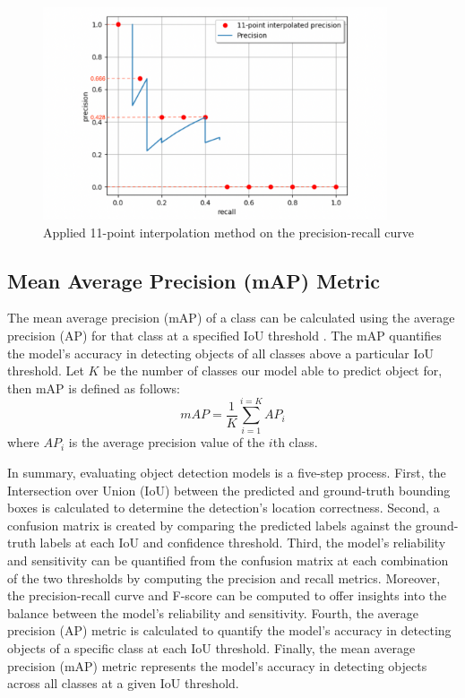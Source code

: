\begin{figure}[!ht]
    \centering
    \includegraphics[width=4in]{figures/11AP_ex.png}
    \caption{Applied 11-point interpolation method on the precision-recall curve \cite{metrics_survey_2020}}
    \label{fig:11AP_ex}
\end{figure}

\subsection{Mean Average Precision (mAP) Metric}  \label{subsec:mean_ap_metric}
The mean average precision (mAP) of a class can be calculated using the average precision (AP) for that class at a specified IoU threshold \cite{szeliski_cv_book}. The mAP quantifies the model's accuracy in detecting objects of all classes above a particular IoU threshold. Let $K$ be the number of classes our model able to predict object for, then mAP is defined as follows:
\begin{equation}
    mAP = \frac{1}{K} \sum_{i=1}^{i=K}AP_i
\end{equation}
where $AP_i$ is the average precision value of the $i$th class.

In summary, evaluating object detection models is a five-step process. First, the Intersection over Union (IoU) between the predicted and ground-truth bounding boxes is calculated to determine the detection's location correctness. Second, a confusion matrix is created by comparing the predicted labels against the ground-truth labels at each IoU and confidence threshold. Third, the model's reliability and sensitivity can be quantified from the confusion matrix at each combination of the two thresholds by computing the precision and recall metrics. Moreover, the precision-recall curve and F-score can be computed to offer insights into the balance between the model's reliability and sensitivity. Fourth, the average precision (AP) metric is calculated to quantify the model's accuracy in detecting objects of a specific class at each IoU threshold. Finally, the mean average precision (mAP) metric represents the model's accuracy in detecting objects across all classes at a given IoU threshold. 

